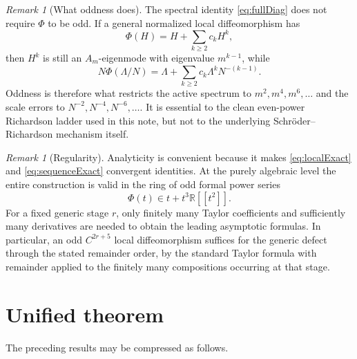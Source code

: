 \documentclass[11pt]{article}
\theoremstyle{remark}
\newtheorem{remark}[theorem]{Remark}
\newcommand{\RR}{\mathbb R}
\begin{document}
\begin{remark}[What oddness does]
The spectral identity \eqref{eq:fullDiag} does not require \(\Phi\) to be
odd.  If a general normalized local diffeomorphism has
\[
\Phi(H)=H+\sum_{k\ge2}c_kH^k,
\]
then \(H^k\) is still an \(A_m\)-eigenmode with eigenvalue
\(m^{k-1}\), while
\[
N\Phi(\Lambda/N)
=
\Lambda+
\sum_{k\ge2}c_k\Lambda^kN^{-(k-1)}.
\]
Oddness is therefore what restricts the active spectrum to
\(m^2,m^4,m^6,\ldots\) and the scale errors to
\(N^{-2},N^{-4},N^{-6},\ldots\).  It is essential to the clean even-power
Richardson ladder used in this note, but not to the underlying
Schr\"oder--Richardson mechanism itself.
\end{remark}

\begin{remark}[Regularity]
Analyticity is convenient because it makes
\eqref{eq:localExact} and \eqref{eq:sequenceExact} convergent identities.
At the purely algebraic level the entire construction is valid in the
ring of odd formal power series
\[
\Phi(t)\in t+t^3\RR[[t^2]].
\]
For a fixed generic stage \(r\), only finitely many Taylor coefficients
and sufficiently many derivatives are needed to obtain the leading
asymptotic formulas.  In particular, an odd \(C^{2r+5}\) local
diffeomorphism suffices for the generic defect through the stated remainder
order, by the standard Taylor formula with remainder applied to the finitely
many compositions occurring at that stage.
\end{remark}

\section{Unified theorem}

The preceding results may be compressed as follows.
\end{document}
